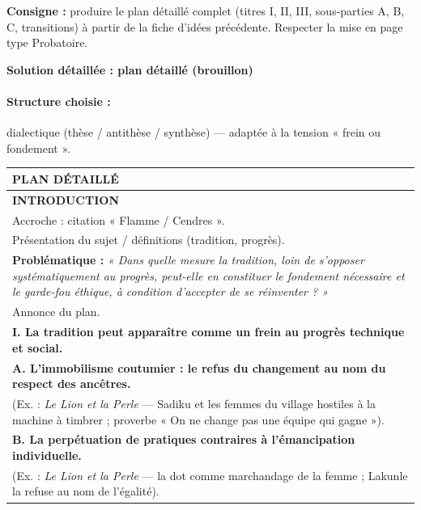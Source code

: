 \documentclass[11pt]{article}
\begin{document}
\begin{exoresolu}
\textbf{Consigne :} produire le plan détaillé complet (titres I, II, III, sous-parties A, B, C, transitions) à partir de la fiche d'idées précédente. Respecter la mise en page type Probatoire.

\tcblower
\textbf{Solution détaillée : plan détaillé (brouillon)}

\paragraph{Structure choisie :} dialectique (thèse / antithèse / synthèse) — adaptée à la tension « frein ou fondement ».

\begin{center}
\begin{tabularx}{\linewidth}{|X|}\hline
\rowcolor{popblueL}\textbf{PLAN DÉTAILLÉ} \\ \hline
\textbf{INTRODUCTION} \\
\hspace{0.5cm} Accroche : citation « Flamme / Cendres ». \\
\hspace{0.5cm} Présentation du sujet / définitions (tradition, progrès). \\
\hspace{0.5cm} \textbf{Problématique :} \emph{« Dans quelle mesure la tradition, loin de s'opposer systématiquement au progrès, peut-elle en constituer le fondement nécessaire et le garde-fou éthique, à condition d'accepter de se réinventer ? »} \\
\hspace{0.5cm} Annonce du plan. \\ \hline
\textbf{I. La tradition peut apparaître comme un frein au progrès technique et social.} \\
\hspace{0.5cm} \textbf{A. L'immobilisme coutumier : le refus du changement au nom du respect des ancêtres.} \\
\hspace{1cm} (Ex. : \emph{Le Lion et la Perle} — Sadiku et les femmes du village hostiles à la machine à timbrer ; proverbe « On ne change pas une équipe qui gagne »). \\
\hspace{0.5cm} \textbf{B. La perpétuation de pratiques contraires à l'émancipation individuelle.} \\
\hspace{1cm} (Ex. : \emph{Le Lion et la Perle} — la dot comme marchandage de la femme ; Lakunle la refuse au nom de l'égalité). \\

\end{tabularx}
\end{center}
\end{exoresolu}
\end{document}

